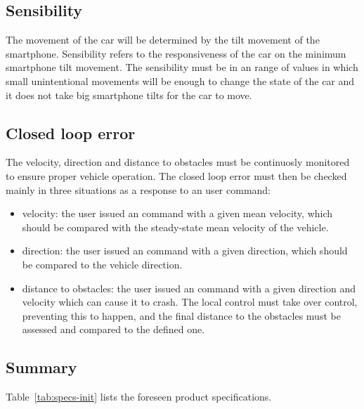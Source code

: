 \subsection{Sensibility}%
\label{sec:org622e63a}
The movement of the car will be determined by the tilt movement of the smartphone. Sensibility refers to the responsiveness of the car on the minimum smartphone tilt movement. The sensibility must be in an range of values in which small unintentional movements will be enough to change the state of the car and it does not take big smartphone tilts for the car to move.
\subsection{Closed loop error}%
\label{sec:org436f732}
The velocity, direction and distance to obstacles must be continuosly monitored to ensure proper vehicle operation. The closed loop error must then be checked mainly in three situations as a response to an user command:
\begin{itemize}
\item velocity: the user issued an command with a given mean velocity, which should be compared with the steady-state mean velocity of the vehicle.
\item direction: the user issued an command with a given direction, which should be compared to the vehicle direction.
\item distance to obstacles: the user issued an command with a given direction and velocity which can cause it to crash. The local control must take over control, preventing this to happen, and the final distance to the obstacles must be assessed and compared to the defined one.
\end{itemize}
\subsection{Summary}%
\label{sec:org1f95256}
Table~\ref{tab:specs-init} lists the foreseen product specifications.


